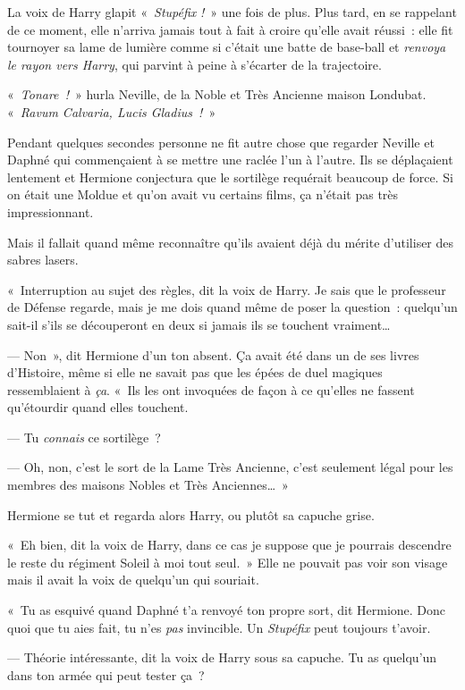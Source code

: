 La voix de Harry glapit «~\emph{Stupéfix} \emph{!}~» une fois de plus. Plus tard, en se rappelant de ce moment, elle n'arriva jamais tout à fait à croire qu'elle avait réussi~: elle fit tournoyer sa lame de lumière comme si c'était une batte de base-ball et \emph{renvoya le rayon vers Harry}, qui parvint à peine à s'écarter de la trajectoire.

«~\emph{Tonare~!}~» hurla Neville, de la Noble et Très Ancienne maison Londubat. «~\emph{Ravum Calvaria, Lucis Gladius~!}~»

\later

Pendant quelques secondes personne ne fit autre chose que regarder Neville et Daphné qui commençaient à se mettre une raclée l'un à l'autre. Ils se déplaçaient lentement et Hermione conjectura que le sortilège requérait beaucoup de force. Si on était une Moldue et qu'on avait vu certains films, ça n'était pas très impressionnant.

Mais il fallait quand même reconnaître qu'ils avaient déjà du mérite d'utiliser des sabres lasers.

«~Interruption au sujet des règles, dit la voix de Harry. Je sais que le professeur de Défense regarde, mais je me dois quand même de poser la question~: quelqu'un sait-il s'ils se découperont en deux si jamais ils se touchent vraiment…

--- Non~», dit Hermione d'un ton absent. Ça avait été dans un de ses livres d'Histoire, même si elle ne savait pas que les épées de duel magiques ressemblaient à \emph{ça}. «~Ils les ont invoquées de façon à ce qu'elles ne fassent qu'étourdir quand elles touchent.

--- Tu \emph{connais} ce sortilège~?

--- Oh, non, c'est le sort de la Lame Très Ancienne, c'est seulement légal pour les membres des maisons Nobles et Très Anciennes…~»

Hermione se tut et regarda alors Harry, ou plutôt sa capuche grise.

«~Eh bien, dit la voix de Harry, dans ce cas je suppose que je pourrais descendre le reste du régiment Soleil à moi tout seul.~» Elle ne pouvait pas voir son visage mais il avait la voix de quelqu'un qui souriait.

«~Tu as esquivé quand Daphné t'a renvoyé ton propre sort, dit Hermione. Donc quoi que tu aies fait, tu n'es \emph{pas} invincible. Un \emph{Stupéfix} peut toujours t'avoir.

--- Théorie intéressante, dit la voix de Harry sous sa capuche. Tu as quelqu'un dans ton armée qui peut tester ça~?

